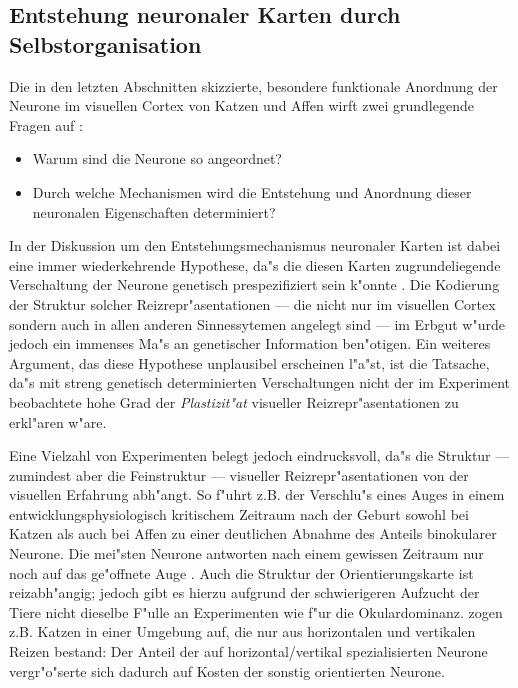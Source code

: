 \subsection{Entstehung neuronaler Karten durch Selbstorganisation}
\label{plastizitaet}

Die in den letzten Abschnitten skizzierte, besondere funktionale Anordnung
der Neurone im visuellen Cortex von Katzen und Affen wirft zwei
grundlegende Fragen auf \cite{marlsburg:1973}:

\begin{itemize}
\item Warum sind die Neurone so angeordnet?
\item Durch welche Mechanismen wird die Entstehung und Anordnung dieser
neuronalen Eigenschaften determiniert?
\end{itemize}

In der Diskussion um den Entstehungsmechanismus neuronaler Karten ist dabei
eine immer wiederkehrende Hypothese, da"s die diesen Karten
zugrundeliegende Verschaltung der Neurone genetisch prespezifiziert sein
k"onnte . Die Kodierung der
Struktur solcher Reizrepr"asentationen --- die nicht nur im visuellen
Cortex sondern auch in allen anderen Sinnessytemen angelegt sind --- im
Erbgut w"urde jedoch ein immenses Ma"s an genetischer Information
ben"otigen.  Ein weiteres Argument, das diese Hypothese unplausibel
erscheinen l"a"st, ist die Tatsache, da"s mit streng genetisch
determinierten Verschaltungen nicht der im Experiment beobachtete hohe Grad
der \emph{Plastizit"at} visueller Reizrepr"asentationen zu erkl"aren w"are.
 
Eine Vielzahl von Experimenten belegt jedoch eindrucksvoll, da"s die
Struktur --- zumindest aber die Feinstruktur --- visueller
Reizrepr"asentationen von der visuellen Erfahrung abh"angt. So f"uhrt
z.B. der Verschlu"s eines Auges in einem entwicklungsphysiologisch
kritischem Zeitraum nach der Geburt sowohl bei Katzen als auch bei Affen zu
einer deutlichen Abnahme des Anteils binokularer Neurone. Die mei"sten
Neurone antworten nach einem gewissen Zeitraum nur noch auf das ge"offnete
Auge . Auch die Struktur der
Orientierungskarte ist reizabh"angig; jedoch gibt es hierzu aufgrund der
schwierigeren Aufzucht der Tiere nicht dieselbe F"ulle an Experimenten wie
f"ur die Okulardominanz.  zogen z.B. Katzen in
einer Umgebung auf, die nur aus horizontalen und vertikalen Reizen bestand:
Der Anteil der auf horizontal/vertikal spezialisierten Neurone
vergr"o"serte sich dadurch auf Kosten der sonstig orientierten Neurone.


